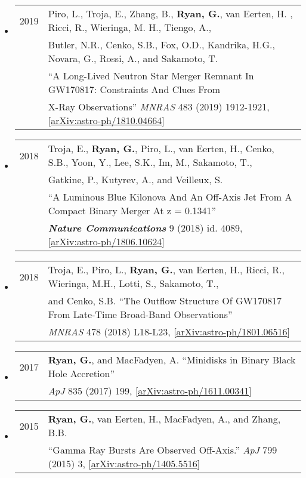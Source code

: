 \begin{itemize}
\item \begin{tabular}{ll}
2019 &  Piro, L., Troja, E., Zhang, B., {\bf Ryan, G.}, van Eerten, H. , Ricci, R., Wieringa, M. H., Tiengo, A.,\\
	& Butler, N.R., Cenko, S.B., Fox, O.D., Kandrika, H.G., Novara, G., Rossi, A., and Sakamoto, T. \\
	& ``A Long-Lived Neutron Star Merger Remnant In GW170817: Constraints And Clues From\\
	& X-Ray Observations'' \emph{MNRAS} 483 (2019) 1912-1921, [\href{https://arxiv.org/abs/1810.04664}{arXiv:astro-ph/1810.04664}]
\end{tabular}

\item \begin{tabular}{ll}
2018 & Troja, E., {\bf Ryan, G.}, Piro, L., van Eerten, H., Cenko, S.B., Yoon, Y., Lee, S.K., Im, M., Sakamoto, T., \\
	& Gatkine, P., Kutyrev, A., and Veilleux, S. \\
	& ``A Luminous Blue Kilonova And An Off-Axis Jet From A Compact Binary Merger At z = 0.1341''\\
	& \emph{\bf Nature Communications} 9 (2018) id. 4089, [\href{https://arxiv.org/abs/1806.10624}{arXiv:astro-ph/1806.10624}]
\end{tabular}

\item \begin{tabular}{ll}
2018 & Troja, E., Piro, L., {\bf Ryan, G.}, van Eerten, H., Ricci, R., Wieringa, M.H., Lotti, S., Sakamoto, T.,\\
	& and Cenko, S.B. ``The Outflow Structure Of GW170817 From Late-Time Broad-Band Observations'' \\
	& \emph{MNRAS} 478 (2018) L18-L23, [\href{https://arxiv.org/abs/1801.06516}{arXiv:astro-ph/1801.06516}]
\end{tabular}

\item \begin{tabular}{ll}
2017 & {\bf Ryan, G.}, and MacFadyen, A. ``Minidisks in Binary Black Hole Accretion'' \\ 
	& \emph{ApJ} 835 (2017) 199, [\href{https://arxiv.org/abs/1611.00341}{arXiv:astro-ph/1611.00341}]
\end{tabular}

\item \begin{tabular}{ll}
2015 & {\bf Ryan, G.}, van Eerten, H., MacFadyen, A., and Zhang, B.B. \\ 
	& ``Gamma Ray Bursts Are Observed Off-Axis.''  \emph{ApJ} 799 (2015) 3, [\href{https://arxiv.org/abs/1405.5516}{arXiv:astro-ph/1405.5516}] \\
\end{tabular}


\end{itemize}
